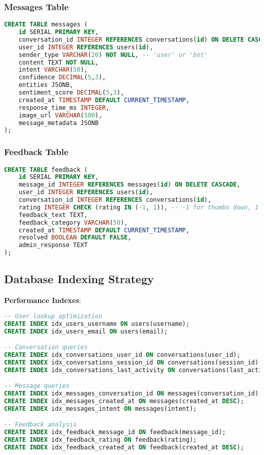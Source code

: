 \documentclass[12pt,a4paper]{article}
\begin{document}
\subsubsection{Messages Table}

\begin{lstlisting}[language=SQL, caption=Messages Table Schema]
CREATE TABLE messages (
    id SERIAL PRIMARY KEY,
    conversation_id INTEGER REFERENCES conversations(id) ON DELETE CASCADE,
    user_id INTEGER REFERENCES users(id),
    sender_type VARCHAR(20) NOT NULL, -- 'user' or 'bot'
    content TEXT NOT NULL,
    intent VARCHAR(50),
    confidence DECIMAL(5,3),
    entities JSONB,
    sentiment_score DECIMAL(5,3),
    created_at TIMESTAMP DEFAULT CURRENT_TIMESTAMP,
    response_time_ms INTEGER,
    image_url VARCHAR(500),
    message_metadata JSONB
);
\end{lstlisting}

\subsubsection{Feedback Table}

\begin{lstlisting}[language=SQL, caption=Feedback Table Schema]
CREATE TABLE feedback (
    id SERIAL PRIMARY KEY,
    message_id INTEGER REFERENCES messages(id) ON DELETE CASCADE,
    user_id INTEGER REFERENCES users(id),
    conversation_id INTEGER REFERENCES conversations(id),
    rating INTEGER CHECK (rating IN (-1, 1)), -- -1 for thumbs down, 1 for thumbs up
    feedback_text TEXT,
    feedback_category VARCHAR(50),
    created_at TIMESTAMP DEFAULT CURRENT_TIMESTAMP,
    resolved BOOLEAN DEFAULT FALSE,
    admin_response TEXT
);
\end{lstlisting}

\subsection{Database Indexing Strategy}

\textbf{Performance Indexes}:
\begin{lstlisting}[language=SQL, caption=Database Indexes]
-- User lookup optimization
CREATE INDEX idx_users_username ON users(username);
CREATE INDEX idx_users_email ON users(email);

-- Conversation queries
CREATE INDEX idx_conversations_user_id ON conversations(user_id);
CREATE INDEX idx_conversations_session_id ON conversations(session_id);
CREATE INDEX idx_conversations_last_activity ON conversations(last_activity DESC);

-- Message queries
CREATE INDEX idx_messages_conversation_id ON messages(conversation_id);
CREATE INDEX idx_messages_created_at ON messages(created_at DESC);
CREATE INDEX idx_messages_intent ON messages(intent);

-- Feedback analysis
CREATE INDEX idx_feedback_message_id ON feedback(message_id);
CREATE INDEX idx_feedback_rating ON feedback(rating);
CREATE INDEX idx_feedback_created_at ON feedback(created_at DESC);
\end{lstlisting}
\end{document}
